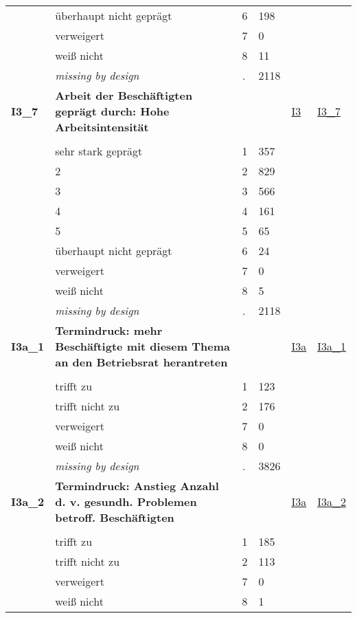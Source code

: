 \begin{longtable}{| L{2.45cm} | L{6cm} | C{1.5cm} | R{1cm} | C{2.25cm} | C{2.25cm} |}
   & überhaupt nicht geprägt & 6 & 198 &  &  \\ 
   & verweigert & 7 & 0 &  &  \\ 
   & weiß nicht & 8 & 11 &  &  \\ 
   & \textit{missing by design} & \textit{.} & 2118 &  &  \\ 
   \midrule
\textbf{I3\_7}\label{var:I3:7} & \textbf{Arbeit der Beschäftigten geprägt durch: Hohe Arbeitsintensität} &  &  & \hyperref[I3]{I3} & \hyperref[var:suf:I3:7]{I3\_7} \\ 
   &  &  &  &  &  \\ 
   & sehr stark geprägt & 1 & 357 &  &  \\ 
   & 2 & 2 & 829 &  &  \\ 
   & 3 & 3 & 566 &  &  \\ 
   & 4 & 4 & 161 &  &  \\ 
   & 5 & 5 & 65 &  &  \\ 
   & überhaupt nicht geprägt & 6 & 24 &  &  \\ 
   & verweigert & 7 & 0 &  &  \\ 
   & weiß nicht & 8 & 5 &  &  \\ 
   & \textit{missing by design} & \textit{.} & 2118 &  &  \\ 
   \midrule
\textbf{I3a\_1}\label{var:I3a:1} & \textbf{Termindruck: mehr Beschäftigte mit diesem Thema an den Betriebsrat herantreten} &  &  & \hyperref[I3a]{I3a} & \hyperref[var:suf:I3a:1]{I3a\_1} \\ 
   &  &  &  &  &  \\ 
   & trifft zu & 1 & 123 &  &  \\ 
   & trifft nicht zu & 2 & 176 &  &  \\ 
   & verweigert & 7 & 0 &  &  \\ 
   & weiß nicht & 8 & 0 &  &  \\ 
   & \textit{missing by design} & \textit{.} & 3826 &  &  \\ 
   \midrule
\textbf{I3a\_2}\label{var:I3a:2} & \textbf{Termindruck: Anstieg Anzahl d. v. gesundh. Problemen betroff. Beschäftigten} &  &  & \hyperref[I3a]{I3a} & \hyperref[var:suf:I3a:2]{I3a\_2} \\ 
   &  &  &  &  &  \\ 
   & trifft zu & 1 & 185 &  &  \\ 
   & trifft nicht zu & 2 & 113 &  &  \\ 
   & verweigert & 7 & 0 &  &  \\ 
   & weiß nicht & 8 & 1 &  &  \\ 

\end{longtable}
